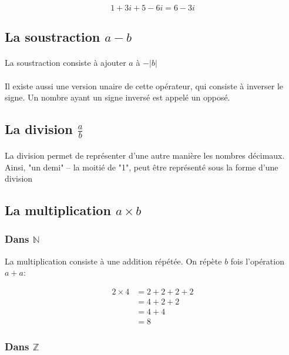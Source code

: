 \documentclass[a4paper]{book}
\begin{document}
    $$1+3i + 5-6i = 6-3i$$
    
    \subsection{La soustraction $a - b$}
    \paragraph{}
    La soustraction consiste à ajouter $a$ à $-|b|$
    \paragraph{}
    Il existe aussi une version unaire de cette opérateur, qui consiste à inverser le signe. Un nombre ayant un signe inversé est appelé un opposé.
    
    \subsection{La division $\frac{a}{b}$}
    \paragraph{}
    La division permet de représenter d'une autre manière les nombres décimaux. Ainsi, "un demi" -- la moitié de "1", peut être représenté sous la forme d'une division 
    
    \subsection{La multiplication $a \times b$}
    \subsubsection{Dans $\mathds{N}$}
    La multiplication consiste à une addition répétée. On répète $b$ fois l'opération $a + a$: 
    
    \begin{equation*}
        \begin{split}
            2 \times 4 &= 2 + 2 + 2 + 2 \\
            &= 4 + 2 +2 \\
            &= 4 + 4 \\
            &= 8
        \end{split}
    \end{equation*}
    
    \subsubsection{Dans $\mathds{Z}$}
\end{document}
